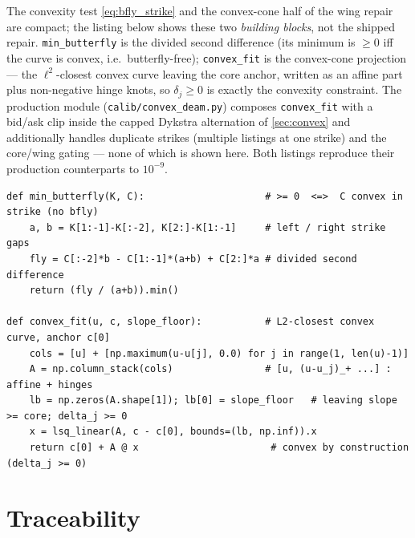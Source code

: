\documentclass[11pt]{article}
\begin{document}
The convexity test \eqref{eq:bfly_strike} and the convex-cone half of the wing
repair are compact; the listing below shows these two \emph{building blocks},
not the shipped repair. \texttt{min\_butterfly} is the divided second
difference (its minimum is $\ge0$ iff the curve is convex, i.e.\
butterfly-free); \texttt{convex\_fit} is the convex-cone projection --- the
$\ell^2$-closest convex curve leaving the core anchor, written as an affine
part plus non-negative hinge knots, so $\delta_j\ge0$ is exactly the convexity
constraint. The production module (\texttt{calib/convex\_deam.py}) composes
\texttt{convex\_fit} with a bid/ask clip inside the capped Dykstra alternation
of \cref{sec:convex} and additionally handles duplicate strikes (multiple
listings at one strike) and the core/wing gating --- none of which is shown
here. Both listings reproduce their production counterparts to $10^{-9}$.

\begin{lstlisting}[caption={The no-butterfly test and the convex wing fit (distilled
from \texttt{calib/convex\_deam.py}).}]
def min_butterfly(K, C):                     # >= 0  <=>  C convex in strike (no bfly)
    a, b = K[1:-1]-K[:-2], K[2:]-K[1:-1]     # left / right strike gaps
    fly = C[:-2]*b - C[1:-1]*(a+b) + C[2:]*a # divided second difference
    return (fly / (a+b)).min()

def convex_fit(u, c, slope_floor):           # L2-closest convex curve, anchor c[0]
    cols = [u] + [np.maximum(u-u[j], 0.0) for j in range(1, len(u)-1)]
    A = np.column_stack(cols)                # [u, (u-u_j)_+ ...] : affine + hinges
    lb = np.zeros(A.shape[1]); lb[0] = slope_floor   # leaving slope >= core; delta_j >= 0
    x = lsq_linear(A, c - c[0], bounds=(lb, np.inf)).x
    return c[0] + A @ x                       # convex by construction (delta_j >= 0)
\end{lstlisting}

\section{Traceability}
\label{app:trace}
\end{document}
